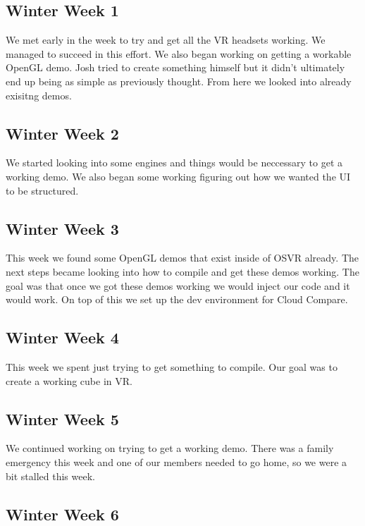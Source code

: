 \documentclass{article}
\begin{document}
\subsection{Winter Week 1}

We met early in the week to try and get all the VR headsets working. 
We managed to succeed in this effort.
We also began working on getting a workable OpenGL demo.
Josh tried to create something himself but it didn't ultimately end up being as simple as previously thought.
From here we looked into already exisitng demos.

\subsection{Winter Week 2}

We started looking into some engines and things would be neccessary to get a working demo.
We also began some working figuring out how we wanted the UI to be structured.

\subsection{Winter Week 3}

This week we found some OpenGL demos that exist inside of OSVR already.
The next steps became looking into how to compile and get these demos working.
The goal was that once we got these demos working we would inject our code and it would work.
On top of this we set up the dev environment for Cloud Compare.

\subsection{Winter Week 4}

This week we spent just trying to get something to compile.
Our goal was to create a working cube in VR.

\subsection{Winter Week 5}

We continued working on trying to get a working demo.
There was a family emergency this week and one of our members needed to go home, so we were a bit stalled this week.

\subsection{Winter Week 6}
\end{document}
